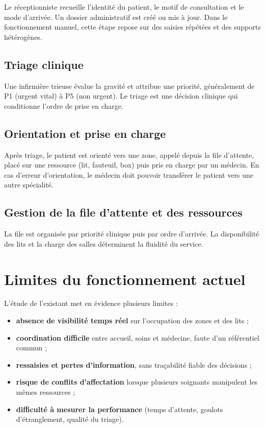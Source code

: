 Le réceptionniste recueille l'identité du patient, le motif de consultation et le mode d'arrivée. Un dossier administratif est créé ou mis à jour. Dans le fonctionnement manuel, cette étape repose sur des saisies répétées et des supports hétérogènes.

\subsection{Triage clinique}

Une infirmière trieuse évalue la gravité et attribue une priorité, généralement de P1 (urgent vital) à P5 (non urgent). Le triage est une décision clinique qui conditionne l'ordre de prise en charge.

\subsection{Orientation et prise en charge}

Après triage, le patient est orienté vers une zone, appelé depuis la file d'attente, placé sur une ressource (lit, fauteuil, box) puis pris en charge par un médecin. En cas d'erreur d'orientation, le médecin doit pouvoir transférer le patient vers une autre spécialité.

\subsection{Gestion de la file d'attente et des ressources}

La file est organisée par priorité clinique puis par ordre d'arrivée. La disponibilité des lits et la charge des salles déterminent la fluidité du service.

\section{Limites du fonctionnement actuel}

L'étude de l'existant met en évidence plusieurs limites :

\begin{itemize}
    \item \textbf{absence de visibilité temps réel} sur l'occupation des zones et des lits ;
    \item \textbf{coordination difficile} entre accueil, soins et médecine, faute d'un référentiel commun ;
    \item \textbf{ressaisies et pertes d'information}, sans traçabilité fiable des décisions ;
    \item \textbf{risque de conflits d'affectation} lorsque plusieurs soignants manipulent les mêmes ressources ;
    \item \textbf{difficulté à mesurer la performance} (temps d'attente, goulots d'étranglement, qualité du triage).
\end{itemize}

